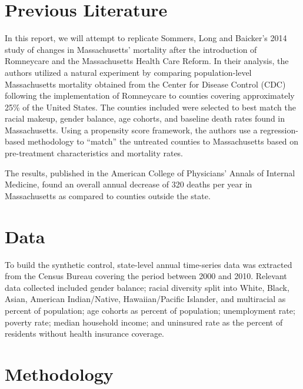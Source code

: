 \documentclass[
]{article}
\begin{document}
\hypertarget{previous-literature}{%
\section{Previous Literature}\label{previous-literature}}

In this report, we will attempt to replicate Sommers, Long and Baicker's
2014 study of changes in Massachusetts' mortality after the introduction
of Romneycare and the Massachusetts Health Care Reform. In their
analysis, the authors utilized a natural experiment by comparing
population-level Massachusetts mortality obtained from the Center for
Disease Control (CDC) following the implementation of Romneycare to
counties covering approximately 25\% of the United States. The counties
included were selected to best match the racial makeup, gender balance,
age cohorts, and baseline death rates found in Massachusetts. Using a
propensity score framework, the authors use a regression-based
methodology to ``match'' the untreated counties to Massachusetts based
on pre-treatment characteristics and mortality rates.

The results, published in the American College of Physicians' Annals of
Internal Medicine, found an overall annual decrease of 320 deaths per
year in Massachusetts as compared to counties outside the state.

\hypertarget{data}{%
\section{Data}\label{data}}

To build the synthetic control, state-level annual time-series data was
extracted from the Census Bureau covering the period between 2000 and
2010. Relevant data collected included gender balance; racial diversity
split into White, Black, Asian, American Indian/Native, Hawaiian/Pacific
Islander, and multiracial as percent of population; age cohorts as
percent of population; unemployment rate; poverty rate; median household
income; and uninsured rate as the percent of residents without health
insurance coverage.

\hypertarget{methodology}{%
\section{Methodology}\label{methodology}}
\end{document}
